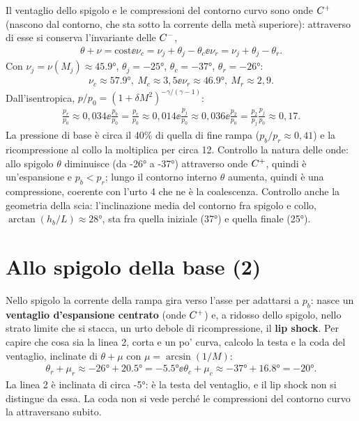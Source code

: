 Il ventaglio dello spigolo e le compressioni del contorno curvo sono onde $C^{+}$ (nascono dal contorno, che sta sotto
la corrente della metà superiore): attraverso di esse si conserva l'invariante delle $C^{-}$,
\begin{gather*}
\theta+\nu=\text{cost} \ee
\nu_c=\nu_j+\theta_j-\theta_c \ee
\nu_r=\nu_j+\theta_j-\theta_r .
\end{gather*}
Con $\nu_j=\nu(M_j)\approx\ang{45.9}$, $\theta_j=\ang{-25}$, $\theta_c=\ang{-37}$, $\theta_r=\ang{-26}$:
\begin{gather*}
\nu_c\approx\ang{57.9},\ M_c\approx3{,}5 \ee
\nu_r\approx\ang{46.9},\ M_r\approx2{,}9 .
\end{gather*}
Dall'isentropica, $p/p_0=(1+\delta M^2)^{-\gamma/(\gamma-1)}$:
\begin{gather*}
\frac{p_r}{p_0}\approx0{,}034 \ee
\frac{p_b}{p_0}=\frac{p_c}{p_0}\approx0{,}014 \ee
\frac{p_j}{p_0}\approx0{,}036 \ee
\frac{p_2}{p_0}=\frac{p_2}{p_j}\frac{p_j}{p_0}\approx0{,}17 .
\end{gather*}
La pressione di base è circa il 40\% di quella di fine rampa ($p_b/p_r\approx0{,}41$) e la ricompressione al collo la
moltiplica per circa 12. Controllo la natura delle onde: allo spigolo $\theta$ diminuisce (da \ang{-26} a \ang{-37})
attraverso onde $C^{+}$, quindi è un'espansione e $p_b<p_r$; lungo il contorno interno $\theta$ aumenta, quindi è una
compressione, coerente con l'urto 4 che ne è la coalescenza. Controllo anche la geometria della scia: l'inclinazione
media del contorno fra spigolo e collo, $\arctan(h_b/L)\approx\ang{28}$, sta fra quella iniziale (\ang{37}) e quella
finale (\ang{25}).

\section*{Allo spigolo della base (2)}
Nello spigolo la corrente della rampa gira verso l'asse per adattarsi a $p_b$: nasce un \textbf{ventaglio
d'espansione centrato} (onde $C^{+}$) e, a ridosso dello spigolo, nello strato limite che si stacca, un urto debole di
ricompressione, il \textbf{lip shock}. Per capire che cosa sia la linea 2, corta e un po' curva, calcolo la testa e la
coda del ventaglio, inclinate di $\theta+\mu$ con $\mu=\arcsin(1/M)$:
\begin{gather*}
\theta_r+\mu_r\approx\ang{-26}+\ang{20.5}=\ang{-5.5} \ee
\theta_c+\mu_c\approx\ang{-37}+\ang{16.8}=\ang{-20} .
\end{gather*}
La linea 2 è inclinata di circa \ang{-5}: è la testa del ventaglio, e il lip shock non si distingue da essa. La coda
non si vede perché le compressioni del contorno curvo la attraversano subito.

